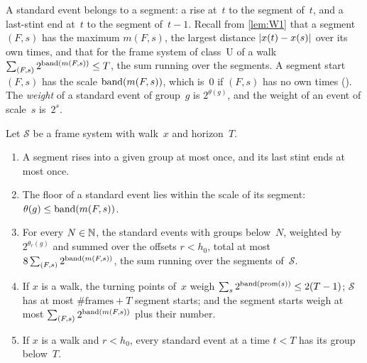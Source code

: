 A standard event belongs to a segment: a rise at~$t$ to the segment of~$t$, and a last-stint end at~$t$ to the segment of~$t-1$.
Recall from \cref{lem:W1} that a segment $(F,s)$ has the maximum $m(F,s)$, the largest distance $\lvert x(t)-x(s) \rvert$ over its own
times, and that for the frame system of class~U of a walk $\sum_{(F,s)}2^{\operatorname{band}(m(F,s))}\le T$, the sum running over the
segments. A segment start $(F,s)$ has the scale $\operatorname{band}(m(F,s))$, which is~$0$ if $(F,s)$ has no own times
(). The \emph{weight} of a standard event of group~$g$ is $2^{\theta(g)}$, and the weight of an
event of scale~$s$ is~$2^s$.

\begin{lemma}[Budgets]\label{lem:budgets}
Let $\mathcal S$ be a frame system with walk~$x$ and horizon~$T$.
\begin{enumerate}[label=(\alph*)]
\item A segment rises into a given group at most once, and its last stint ends at most once.
\item The floor of a standard event lies within the scale of its segment: $\theta(g)\le\operatorname{band}(m(F,s))$.
\item For every $N\in\mathbb{N}$, the standard events with groups below~$N$, weighted by $2^{\theta_r(g)}$ and summed over the offsets
$r<h_0$, total at most $8\sum_{(F,s)}2^{\operatorname{band}(m(F,s))}$, the sum running over the segments of~$\mathcal S$.
\item If $x$ is a walk, the turning points of~$x$ weigh $\sum_s2^{\operatorname{band}(\operatorname{prom}(s))}\le2(T-1)$; $\mathcal S$ has at most
$\#\text{frames}+T$ segment starts; and the segment starts weigh at most $\sum_{(F,s)}2^{\operatorname{band}(m(F,s))}$ plus their number.
\item If $x$ is a walk and $r<h_0$, every standard event at a time $t<T$ has its group below~$T$.
\end{enumerate}
\end{lemma}

